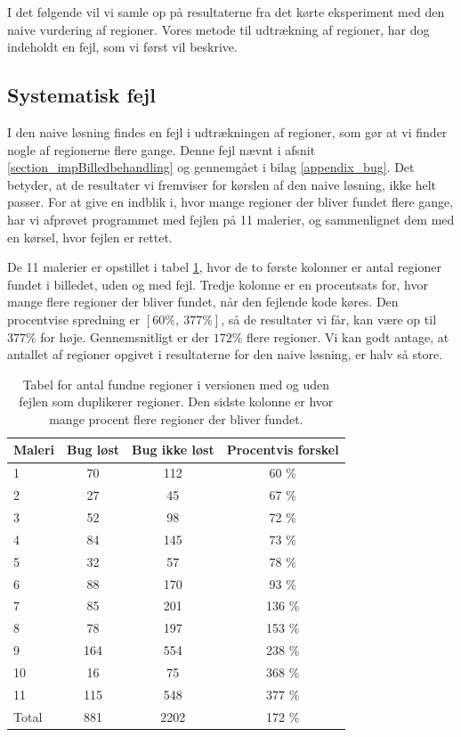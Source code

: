 {
{\sffamily I det følgende vil vi samle op på resultaterne fra det kørte
eksperiment med den naive vurdering af regioner. Vores metode til
udtrækning af regioner, har dog indeholdt en fejl, som vi først vil
beskrive.
}

\subsection{Systematisk fejl\label{program_bug}}
I den naive løsning findes en fejl i udtrækningen af regioner, som gør
at vi finder nogle af
regionerne flere gange. Denne fejl nævnt i afsnit
\ref{section_impBilledbehandling} og gennemgået i bilag
\ref{appendix_bug}. Det betyder, at de resultater vi fremviser for kørslen
af den naive løsning, ikke helt passer. For at give en indblik i, hvor
mange regioner der bliver fundet flere gange, har vi afprøvet programmet med
fejlen på 11 malerier, og sammenlignet dem med en kørsel, hvor fejlen er
rettet.

De 11 malerier er opstillet i tabel \ref{bug_tabel}, hvor de to første
kolonner er antal regioner fundet i billedet, uden og med fejl.  Tredje
kolonne er en procentsats for, hvor mange flere regioner der bliver
fundet, når den fejlende kode køres. Den procentvise spredning er $[60
\%,~377 \%]$, så de resultater vi får, kan være op til $377\%$ for høje.
Gennemsnitligt er der $172 \%$ flere regioner. Vi kan godt antage, at
antallet af regioner opgivet i resultaterne for den naive løsning, er
halv så store.

\begin{table}[!h]
    \centering
    \begin{tabular}{|l|c|c|c|}
        \hline
  Maleri  & Bug løst 		& Bug ikke løst		& Procentvis forskel\\\hline
        1   & 70 			& 112 				& 60 \% \\
        2   & 27 			& 45 				& 67 \% \\
        3	& 52 			& 98 				& 72 \% \\
        4   & 84 			& 145 				& 73 \% \\
        5	& 32 			& 57 				& 78 \% \\
        6   & 88 			& 170 				& 93 \% \\
        7   & 85 			& 201 				& 136 \% \\
        8   & 78 			& 197 				& 153 \% \\
        9   & 164 			& 554 				& 238 \% \\
        10	& 16 			& 75 				& 368 \% \\
        11	& 115 			& 548 				& 377 \% \\\hline
	Total	& 881			& 2202				& 172 \% \\\hline
	  \end{tabular}
    \caption[]{Tabel for antal fundne regioner i versionen med og uden
    fejlen som duplikerer regioner. Den sidste kolonne er hvor mange
    procent flere regioner der bliver fundet.}
    \label{bug_tabel}
\end{table}

}

